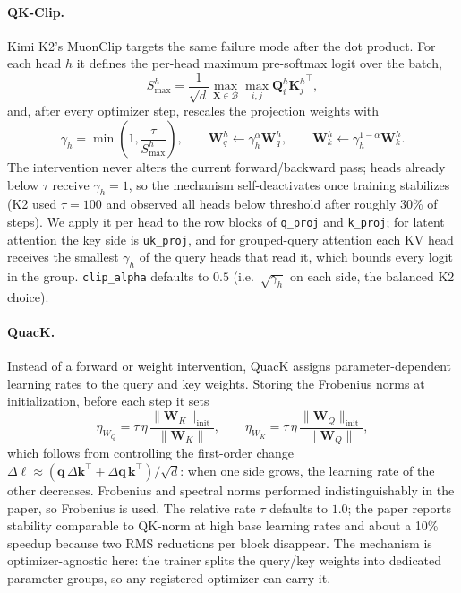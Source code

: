 \paragraph{QK-Clip.}
Kimi K2's MuonClip \citep{kimi2025k2} targets the same failure mode after the dot product. For each head $h$ it defines the per-head maximum pre-softmax logit over the batch,
\[
S^h_{\max}=\frac{1}{\sqrt{d}}\max_{\mathbf{X}\in\mathcal{B}}\max_{i,j}\mathbf{Q}^h_i{\mathbf{K}^h_j}^\top,
\]
and, after every optimizer step, rescales the projection weights with
\[
\gamma_h=\min\!\left(1,\frac{\tau}{S^h_{\max}}\right),\qquad
\mathbf{W}^h_q\leftarrow\gamma_h^{\alpha}\mathbf{W}^h_q,\qquad
\mathbf{W}^h_k\leftarrow\gamma_h^{1-\alpha}\mathbf{W}^h_k .
\]
The intervention never alters the current forward/backward pass; heads already below $\tau$ receive $\gamma_h=1$, so the mechanism self-deactivates once training stabilizes (K2 used $\tau=100$ and observed all heads below threshold after roughly 30\% of steps). We apply it per head to the row blocks of \texttt{q\_proj} and \texttt{k\_proj}; for latent attention the key side is \texttt{uk\_proj}, and for grouped-query attention each KV head receives the smallest $\gamma_h$ of the query heads that read it, which bounds every logit in the group. \texttt{clip\_alpha} defaults to $0.5$ (i.e.\ $\sqrt{\gamma_h}$ on each side, the balanced K2 choice).

\paragraph{QuacK.}
Instead of a forward or weight intervention, QuacK \citep{anson2025controlling} assigns parameter-dependent learning rates to the query and key weights. Storing the Frobenius norms at initialization, before each step it sets
\[
\eta_{W_Q}=\tau\,\eta\,\frac{\|\mathbf{W}_K\|_{\mathrm{init}}}{\|\mathbf{W}_K\|},\qquad
\eta_{W_K}=\tau\,\eta\,\frac{\|\mathbf{W}_Q\|_{\mathrm{init}}}{\|\mathbf{W}_Q\|},
\]
which follows from controlling the first-order change $\Delta\ell\approx(\mathbf{q}\,\Delta\mathbf{k}^\top+\Delta\mathbf{q}\,\mathbf{k}^\top)/\sqrt{d}$: when one side grows, the learning rate of the other decreases. Frobenius and spectral norms performed indistinguishably in the paper, so Frobenius is used. The relative rate $\tau$ defaults to $1.0$; the paper reports stability comparable to QK-norm at high base learning rates and about a 10\% speedup because two RMS reductions per block disappear. The mechanism is optimizer-agnostic here: the trainer splits the query/key weights into dedicated parameter groups, so any registered optimizer can carry it.

